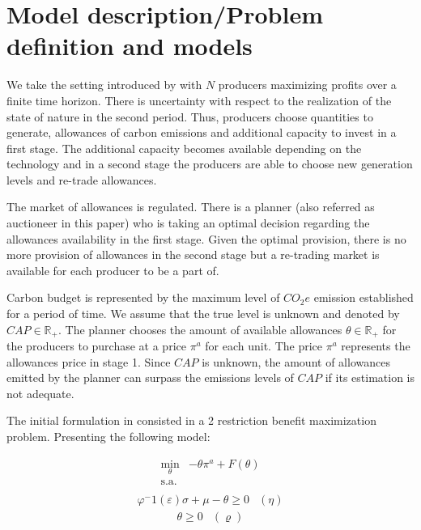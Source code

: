 \documentclass[a4paper,fleqn]{cas-dc}
\begin{document}
\section{Model description/Problem definition and models}\label{sec:model}


We take the setting introduced by \cite{amigo_two_2021} with $N$ producers maximizing profits over a finite time horizon. There is uncertainty with respect to the realization of the state of nature in the second period. Thus, producers choose quantities to generate, allowances of carbon emissions and additional capacity to invest in a first stage. The additional capacity becomes available depending on the technology and in a second stage the producers are able to choose new generation levels and re-trade allowances.

The market of allowances is regulated. There is a planner (also referred as auctioneer in this paper) who is taking an optimal decision regarding the allowances availability in the first stage.  Given the optimal provision, there is no more provision of allowances in the second stage but a re-trading market is available for each producer to be a part of.

Carbon budget is represented by the maximum level of $CO_2e$ emission established for a period of time. We assume that the true level is unknown and denoted by $CAP\in\mathbb{R}_+$. The planner chooses the amount of available allowances $\theta\in\mathbb{R}_+$ for the producers to purchase at a price $\pi^a$ for each unit. The price $\pi^a$ represents the allowances price in stage 1. Since $CAP$ is unknown, the amount of allowances emitted by the planner can surpass the emissions levels of $CAP$ if its estimation is not adequate.

The initial formulation in  \cite{amigo_two_2021} consisted in a 2 restriction benefit maximization problem. Presenting the following model:

\begin{equation}
\begin{array}{rrclcl}
    \displaystyle \min_{\theta} &-\theta \pi^a + F(\theta) \\\textrm{s.a.} \label{eq:sub}\\
\end{array}
\end{equation}
\begin{equation}
\begin{array}{cl}
    \varphi^-1 (\varepsilon )\sigma + \mu - \theta \geq 0 & (\eta) \label{res:sub1}
\end{array}
\end{equation}
\begin{equation}
\begin{array}{cl}
   \theta \geq 0 &  (\varrho)\label{res:sub2}
\end{array}
\end{equation}
\end{document}
